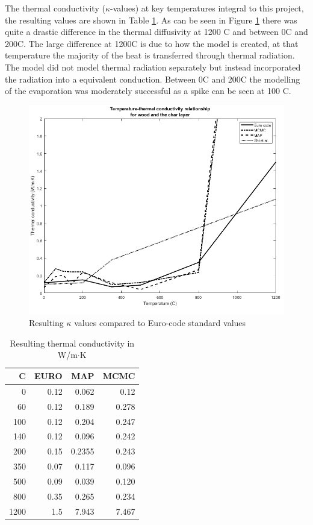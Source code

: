 The thermal conductivity ($\kappa$-values) at key temperatures integral to this project, the resulting values are shown in Table \ref{krestab}. 
As can be seen in Figure \ref{kresult_euro_fig} there was quite a drastic difference in the thermal diffusivity at 1200 \textdegree C and between 0\textdegree C and 200\textdegree C.
The large difference at 1200\textdegree C is due to how the model is created, at that temperature the majority of the heat is transferred through thermal radiation.
The model did not model thermal radiation separately but instead incorporated the radiation into a equivalent conduction.
Between 0\textdegree C and 200\textdegree C the modelling of the evaporation was moderately successful as a spike can be seen at 100 \textdegree C.  
\begin{figure}
\centering
	\label{kresult_euro_fig}
	\includegraphics[width=\textwidth]{figures/kvalues_all_shi.png}
	\caption{Resulting $\kappa$ values compared to Euro-code standard values}
\end{figure}
\begin{table} \label{krestab}
\centering
	\begin{tabular}{ r r r r }
	\toprule
	 \textdegree C & EURO & MAP & MCMC\\
	\midrule
	0   & 0.12&0.062 &0.12\\
	60  &0.12& 0.189 &0.278\\
	100 &0.12& 0.204 &0.247\\
 	140 &0.12& 0.096 &0.242\\
	200 & 0.15& 0.2355 &0.243\\
	350 & 0.07& 0.117  &0.096\\
	500 & 0.09& 0.039 &0.120\\
	800 & 0.35& 0.265 &0.234\\
	1200& 1.5& 7.943 &7.467\\
	\bottomrule	
	\end{tabular}
	\caption{Resulting thermal conductivity in W/m$\cdot$K}
\end{table}
 
